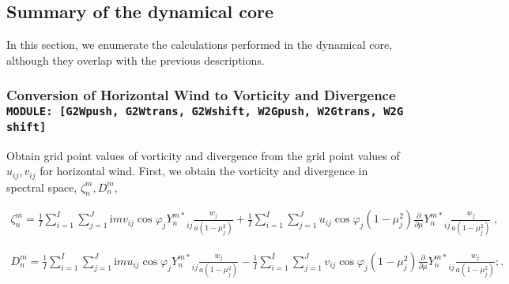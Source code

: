 \hypertarget{summary-of-the-dynamical-core}{%
\subsection{Summary of the dynamical
core}\label{summary-of-the-dynamical-core}}

In this section, we enumerate the calculations performed in the
dynamical core, although they overlap with the previous descriptions.

\hypertarget{conversion-of-horizontal-wind-to-vorticity-and-divergence-module-g2wpush-g2wtrans-g2wshift-w2gpush-w2gtrans-w2gshift}{%
\subsubsection{\texorpdfstring{Conversion of Horizontal Wind to
Vorticity and Divergence
\texttt{MODULE:\ {[}G2Wpush,\ G2Wtrans,\ G2Wshift,\ W2Gpush,\ W2Gtrans,\ W2Gshift{]}}}{Conversion of Horizontal Wind to Vorticity and Divergence MODULE: {[}G2Wpush, G2Wtrans, G2Wshift, W2Gpush, W2Gtrans, W2Gshift{]}}}\label{conversion-of-horizontal-wind-to-vorticity-and-divergence-module-g2wpush-g2wtrans-g2wshift-w2gpush-w2gtrans-w2gshift}}

Obtain grid point values of vorticity and divergence from the grid point
values of \(u_{ij}, v_{ij}\) for horizontal wind. First, we obtain the
vorticity and divergence in spectral space, \(\zeta_n^m, D_n^m\),

\begin{eqnarray}
\zeta_n^m  =  \frac{1}{I} \sum_{i=1}^{I} \sum_{j=1}^{J}  
                  \mathrm{i}m v_{ij} \cos\varphi_j {Y_n^{m*}}_{ij}
                \frac{w_j}{a(1-\mu_j^{2})}
           +    \frac{1}{I} \sum_{i=1}^{I} \sum_{j=1}^{J}  
                     u_{ij} \cos\varphi_j (1-\mu_j^2)
                  \frac{\partial }{\partial \mu} {Y_n^{m*}}_{ij}
                 \frac{w_j}{a(1-\mu_j^{2})} \; ,
\end{eqnarray}

\begin{eqnarray}
    D_n^m  =  \frac{1}{I} \sum_{i=1}^{I} \sum_{j=1}^{J}  
                  \mathrm{i}m u_{ij} \cos\varphi_j {Y_n^{m*}}_{ij}
                \frac{w_j}{a(1-\mu_j^{2})}
           -    \frac{1}{I} \sum_{i=1}^{I} \sum_{j=1}^{J}  
                  v_{ij} \cos\varphi_j  (1-\mu_j^2)
                  \frac{\partial }{\partial \mu} {Y_n^{m*}}_{ij}
                 \frac{w_j}{a(1-\mu_j^{2})} ; .
\end{eqnarray}

